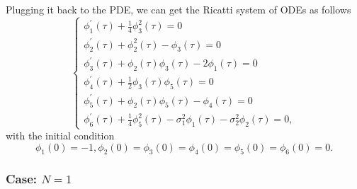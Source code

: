 \documentclass{article}
\begin{document}
Plugging it back to the PDE, we can get the Ricatti system of ODEs as follows
\begin{equation*}
    \begin{cases}
   \phi_{1}^{'} (\tau) + \frac{1}{4} \phi_{3}^{2}(\tau) = 0 \\
   \phi_{2}^{'} (\tau) + \phi_{2}^{2}(\tau) - \phi_{3}(\tau) = 0 \\
   \phi_{3}^{'} (\tau) + \phi_{2}(\tau)\phi_{3}(\tau) - 2 \phi_{1}(\tau) = 0 \\
   \phi_{4}^{'} (\tau) + \frac{1}{2} \phi_{3} (\tau) \phi_{5}(\tau) = 0 \\
   \phi_{5}^{'} (\tau) + \phi_{2} (\tau) \phi_{5}(\tau) - \phi_{4}(\tau) = 0 \\
   \phi_{6}^{'} (\tau) + \frac{1}{4} \phi_{5}^{2} (\tau) - \sigma_{1}^{2} \phi_{1}(\tau) - \sigma_{2}^{2} \phi_{2}(\tau) = 0,
   \end{cases}
\end{equation*}
with the initial condition
\begin{equation*}
    \phi_{1}(0) = -1, \phi_{2}(0) = \phi_{3}(0) = \phi_{4}(0) = \phi_{5}(0) = \phi_{6}(0) = 0.
\end{equation*}

\subsubsection{Case: $N = 1$}
\end{document}
